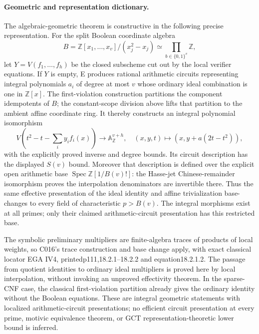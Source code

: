 \paragraph{Geometric and representation dictionary.}
The algebraic-geometric theorem is constructive in the following precise representation. For the split Boolean coordinate algebra
\[
 B=\mathbb Z[x_1,\ldots,x_v]/(x_j^2-x_j)
                 \simeq\prod_{b\in\{0,1\}^v}\mathbb Z,
\]
let $Y=V(f_1,\ldots,f_h)$ be the closed subscheme cut out by the local verifier equations. If $Y$ is empty, E produces rational arithmetic circuits representing integral polynomials $a_i$ of degree at most $v$ whose ordinary ideal combination is one in $\mathbb Z[x]$. The first-violation construction partitions the component idempotents of $B$; the constant-scope division above lifts that partition to the ambient affine coordinate ring. It thereby constructs an integral polynomial isomorphism
\[
 V\left(t^2-t-\sum_i y_i f_i(x)\right)
        \longrightarrow\mathbb A^{v+h}_{\mathbb Z},
 \quad (x,y,t)\longmapsto(x,y+a(2t-t^2)),
\]
with the explicitly proved inverse and degree bounds. Its circuit description has the displayed $S(v)$ bound. Moreover that description is defined over the explicit open arithmetic base $\operatorname{Spec}\mathbb Z[1/B(v)!]$: the Hasse-jet Chinese-remainder isomorphism proves the interpolation denominators are invertible there. Thus the same effective presentation of the ideal identity and affine trivialization base-changes to every field of characteristic $p>B(v)$. The integral morphisms exist at all primes; only their claimed arithmetic-circuit presentation has this restricted base.

The symbolic preliminary multipliers are finite-algebra traces of products of local weights, so C016's trace construction and base change apply, with exact classical locator EGA IV4, printedp111,18.2.1--18.2.2 and equation18.2.1.2. The passage from quotient identities to ordinary ideal multipliers is proved here by local interpolation, without invoking an unproved effectivity theorem. In the sparse-CNF case, the classical first-violation partition already gives the ordinary identity without the Boolean equations. These are integral geometric statements with localized arithmetic-circuit presentations; no efficient circuit presentation at every prime, motivic equivalence theorem, or GCT representation-theoretic lower bound is inferred.



